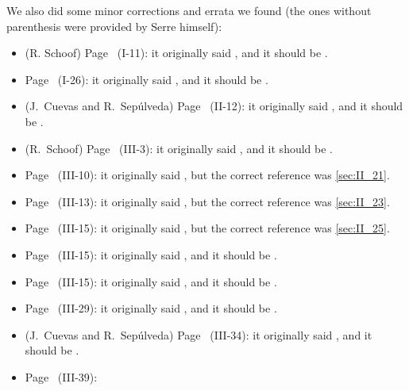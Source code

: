 We also did some minor corrections and errata we found (the ones without
parenthesis were provided by Serre himself):
\begin{itemize}
\item (R. Schoof)
	Page~\pageref{errata:LambdaQellprime} (I-11):
	it originally said ,
	and it should be .
\item Page~\pageref{errata:Ls+m2} (I-26):
	it originally said ,
	and it should be .
\item (J.~Cuevas and R.~Sepúlveda)
	Page~\pageref{errata:follows_from_c} (II-12):
	it originally said , and it
	should be .
\item (R.~Schoof)
	Page~\pageref{errata:Qp_embed} (III-3):
	it originally said , and it should be .
\item Page~\pageref{errata:modulus21} (III-10):
	it originally said , but the correct reference
	was \ref{sec:II_21}.
\item Page~\pageref{errata:refIII23} (III-13):
	it originally said , but the correct reference
	was \ref{sec:II_23}.
\item Page~\pageref{errata:refIII24} (III-15):
	it originally said , but the correct reference
	was \ref{sec:II_25}.
\item Page~\pageref{errata:III_prop_to_thm} (III-15):
	it originally said , and it should be .
\item Page~\pageref{errata:III_rmk1_2} (III-15):
	it originally said , and it should
	be .
\item Page~\pageref{errata:Kinfty} (III-29):
	it originally said , and
	it should be .
\item (J.~Cuevas and R.~Sepúlveda)
	Page~\pageref{errata:An+k} (III-34):
	it originally said , and it should be
	.
\item Page~\pageref{errata:III_A2} (III-39):

\end{itemize}

